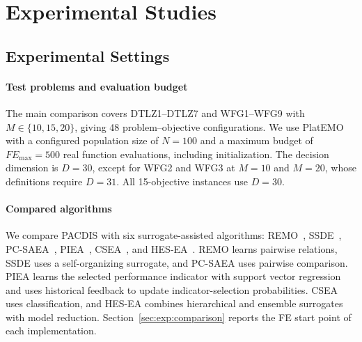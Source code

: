 \documentclass[final,5p,times,twocolumn]{elsarticle}
\begin{document}
\renewcommand{\dbltopfraction}{0.90}
\renewcommand{\dblfloatpagefraction}{0.75}
\setcounter{dbltopnumber}{2}
\setcounter{topnumber}{3}
\setcounter{totalnumber}{4}
\setlength{\textfloatsep}{10pt plus 2pt minus 2pt}
\setlength{\floatsep}{8pt plus 2pt minus 2pt}
\setlength{\intextsep}{10pt plus 2pt minus 2pt}
\setlength{\dbltextfloatsep}{10pt plus 2pt minus 2pt}
\setlength{\dblfloatsep}{8pt plus 2pt minus 2pt}
\makeatletter
\setlength{\@fptop}{0pt}
\setlength{\@dblfptop}{0pt}
\setlength{\@fpsep}{18pt plus 2pt minus 2pt}
\setlength{\@dblfpsep}{18pt plus 2pt minus 2pt}
\makeatother

\section{Experimental Studies}
\label{sec:exp}

\subsection{Experimental Settings}
\label{sec:exp:settings}

\paragraph{Test problems and evaluation budget}
The main comparison covers DTLZ1--DTLZ7 and WFG1--WFG9 with
$M\in\{10,15,20\}$, giving 48 problem--objective configurations.
We use PlatEMO~\cite{ref:platemo} with a configured population size of $N=100$
and a maximum budget of $FE_{\max}=500$ real function evaluations, including
initialization. The decision dimension is $D=30$, except for WFG2 and WFG3
at $M=10$ and $M=20$, whose definitions require $D=31$.
All 15-objective instances use $D=30$.

\paragraph{Compared algorithms}
We compare PACDIS with six surrogate-assisted algorithms:
REMO~\cite{ref:remo}, SSDE~\cite{ref:ssde}, PC-SAEA~\cite{ref:pcsaea},
PIEA~\cite{ref:piea}, CSEA~\cite{ref:csea}, and
HES-EA~\cite{ref:hesea}. REMO learns pairwise relations, SSDE uses a
self-organizing surrogate, and PC-SAEA uses pairwise comparison. PIEA learns
the selected performance indicator with support vector regression and uses
historical feedback to update indicator-selection probabilities.
CSEA uses classification, and HES-EA combines hierarchical and ensemble
surrogates with model reduction. Section~\ref{sec:exp:comparison} reports
the FE start point of each implementation.
\end{document}
